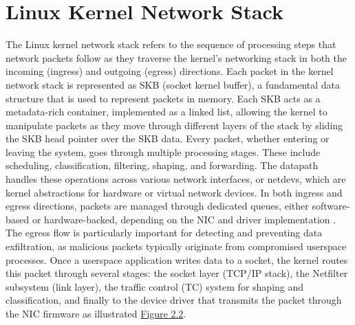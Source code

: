 \documentclass [11pt, proquest] {uwthesis}[2020/02/24]
\begin{document}
\section{Linux Kernel Network Stack}
The Linux kernel network stack refers to the sequence of processing steps that network packets follow as they traverse the kernel’s networking stack in both the incoming (ingress) and outgoing (egress) directions. Each packet in the kernel network stack is represented as SKB (socket kernel buffer), a fundamental data structure that is used to represent packets in memory. Each SKB acts as a metadata-rich container, implemented as a linked list, allowing the kernel to manipulate packets as they move through different layers of the stack by sliding the SKB head pointer over the SKB data. Every packet, whether entering or leaving the system, goes through multiple processing stages. These include scheduling, classification, filtering, shaping, and forwarding. The datapath handles these operations across various network interfaces, or netdevs, which are kernel abstractions for hardware or virtual network devices. In both ingress and egress directions, packets are managed through dedicated queues, either software-based or hardware-backed, depending on the NIC and driver implementation \cite{stephan2024path}. The egress flow is particularly important for detecting and preventing data exfiltration, as malicious packets typically originate from compromised userspace processes. Once a userspace application writes data to a socket, the kernel routes this packet through several stages: the socket layer (TCP/IP stack), the Netfilter subsystem (link layer), the traffic control (TC) system for shaping and classification, and finally to the device driver that transmits the packet through the NIC firmware as illustrated \hyperref[sec:kernel-network-datapath]{Figure 2.2}.

\end{document}
